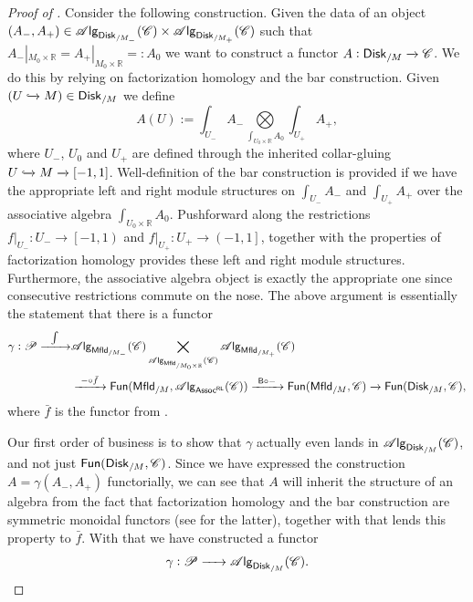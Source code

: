 \documentclass[../text]{subfiles}
\begin{document}
\begin{proof}[Proof of ]
    Consider the following construction. Given the data of an object $(A_-, A_+) \in \alg{\disk[r]_{/M_-}} (\catC) \times \alg{\disk[r]_{/M_+}} (\catC)$ such that $A_-|_{M_0 \times \mathbb{R}} = A_+|_{M_0 \times \mathbb{R}} = : A_0$ we want to construct a functor $A: \disk[r]_{/M} \xrightarrow{} \catC$. We do this by relying on factorization homology and the bar construction. Given $(U \xhookrightarrow{} M) \in \disk[r]_{/M}$ we define
    \begin{equation}\label{eq:def_of_A_in_proof}
        A(U) := \int_{U_-} A_- \bigotimes\limits_{\int_{U_0 \times \mathbb{R}} A_0} \int_{U_+} A_+,
    \end{equation}
    where $U_-$, $U_0$ and $U_+$ are defined through the inherited collar-gluing $U \xhookrightarrow{} M \xrightarrow{} [-1,1]$. Well-definition of the bar construction is provided if we have the appropriate left and right module structures on $\int_{U_-} A_-$ and $\int_{U_+} A_+$ over the associative algebra $\int_{U_0 \times \mathbb{R}} A_0$. Pushforward along the restrictions $f|_{U_-}: U_- \rightarrow \left[-1, 1\right)$ and $f|_{U_+}: U_+ \rightarrow \left(-1, 1\right]$, together with the properties of factorization homology provides these left and right module structures. Furthermore, the associative algebra object is exactly the appropriate one since consecutive restrictions commute on the nose. The above argument is essentially the statement that there is a functor
    \begin{align}
        \gamma: \mathscr{P} \xrightarrow{\ \ \int \ \ } &\alg{\mfld[r]_{/M_-}}(\catC) \bigtimes\limits_{\alg{\mfld[r]_{/M_0 \times \mathbb{R}}} (\catC)} \alg{\mfld[r]_{/M_+}} (\catC)\notag\\ &\xrightarrow{\ - \circ \bar{f} \ } \mathsf{Fun}(\mfld[r]_{/M}, \alg{\mathsf{Assoc^{RL}}} (\catC)) \xrightarrow{\ \mathsf{B} \circ - \ } \mathsf{Fun}(\mfld[r]_{/M},\catC) \xrightarrow{\ } \mathsf{Fun}(\disk[r]_{/M}, \catC),
    \end{align}
    where $\bar{f}$ is the functor from .

    Our first order of business is to show that $\gamma$ actually even lands in $\alg{\disk[r]_{/M}} (\catC)$, and not just $\mathsf{Fun}(\disk[r]_{/M}, \catC)$. Since we have expressed the construction $A = \gamma(A_-, A_+)$ functorially, we can see that $A$ will inherit the structure of an algebra from the fact that factorization homology and the bar construction are symmetric monoidal functors (see  for the latter), together with  that lends this property to $\bar{f}$. With that we have constructed a functor
    \begin{equation}
        \gamma : \mathscr{P} \xrightarrow{\ \ \ \ } \alg{\disk[r]_{/M}} (\catC).
    \end{equation}
    

\end{proof}
\end{document}
